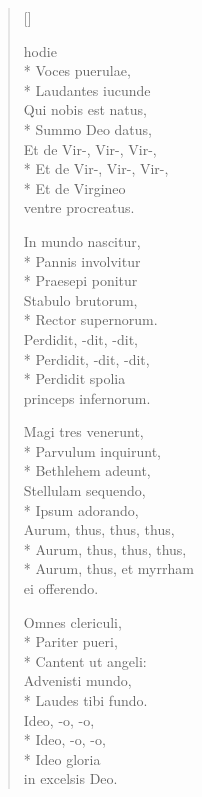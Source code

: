 \newHymn
{}

\pointtrans
\begin{multicols}{2}
\begin{verse}[\versewidth]

 hodie\\*
Voces puerulae,\\*
Laudantes iucunde\\
Qui nobis est natus,\\*
Summo Deo datus,\\
Et de Vir-, Vir-, Vir-,\\*
Et de Vir-, Vir-, Vir-,\\*
Et de Virgineo\\
\qquad ventre procreatus.


In mundo nascitur,\\*
Pannis involvitur\\*
Praesepi ponitur\\
Stabulo brutorum,\\*
Rector supernorum.\\
Perdidit, -dit, -dit,\\*
Perdidit, -dit, -dit,\\*
Perdidit spolia\\
\qquad princeps infernorum.

 Magi tres venerunt,\\*
Parvulum inquirunt,\\*
Bethlehem adeunt,\\
Stellulam sequendo,\\*
Ipsum adorando,\\
Aurum, thus, thus, thus,\\*
Aurum, thus, thus, thus,\\*
Aurum, thus, et myrrham\\
\qquad ei offerendo.

Omnes clericuli,\\*
Pariter pueri,\\*
Cantent ut angeli:\\
Advenisti mundo,\\*
Laudes tibi fundo.\\
Ideo, -o, -o,\\*
Ideo, -o, -o,\\*
Ideo gloria\\
\qquad in excelsis Deo.

\end{verse}
\end{multicols}


